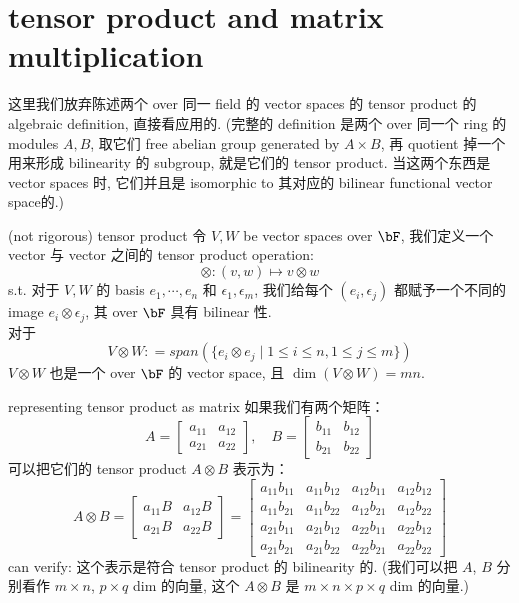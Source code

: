 \chapter{tensor product and matrix multiplication}
这里我们放弃陈述两个 over 同一 field 的 vector spaces 的 tensor product 的 algebraic definition, 直接看应用的. (完整的 definition 是两个 over 同一个 ring 的 modules $A,B$, 取它们 free abelian group generated by $A\times B$, 再 quotient 掉一个用来形成 bilinearity 的 subgroup, 就是它们的 tensor product. 当这两个东西是 vector spaces 时, 它们并且是 isomorphic to 其对应的 bilinear functional vector space的.)
\begin{definition}{(not rigorous) tensor product}
令 $V,W$ be vector spaces over $\bF$, 我们定义一个 vector 与 vector 之间的 tensor product operation:
$$
\otimes :(v,w) \mapsto v \otimes w
$$
s.t. 对于 $V, W$ 的 basis $e_1, \cdots, e_n$ 和 $\epsilon_1, \epsilon_m$, 我们给每个 $(e_i, \epsilon_j)$ 都赋予一个不同的 image $e_i \otimes \epsilon_j$,  其 over $\bF$ 具有 bilinear 性.\\
对于 
$$
V \otimes W : = span(\{ e_i \otimes e_j \mid 1 \leq i \leq n, 1\leq j\leq m    \})
$$
$V \otimes W $ 也是一个 over $\bF$ 的 vector space, 且 $\dim(V \otimes W) = mn$.
\end{definition}

\begin{proposition}{representing tensor product as matrix}
 如果我们有两个矩阵：
\[
A = \begin{bmatrix} a_{11} & a_{12} \\ a_{21} & a_{22} \end{bmatrix}, \quad
B = \begin{bmatrix} b_{11} & b_{12} \\ b_{21} & b_{22} \end{bmatrix}
\]
可以把它们的 tensor product \( A \otimes B \) 表示为：
\[
A \otimes B =
\begin{bmatrix} 
a_{11} B & a_{12} B \\ 
a_{21} B & a_{22} B 
\end{bmatrix}
=
\begin{bmatrix} 
a_{11} b_{11} & a_{11} b_{12} & a_{12} b_{11} & a_{12} b_{12} \\ 
a_{11} b_{21} & a_{11} b_{22} & a_{12} b_{21} & a_{12} b_{22} \\ 
a_{21} b_{11} & a_{21} b_{12} & a_{22} b_{11} & a_{22} b_{12} \\ 
a_{21} b_{21} & a_{21} b_{22} & a_{22} b_{21} & a_{22} b_{22} 
\end{bmatrix}
\]
can verify: 这个表示是符合 tensor product 的 bilinearity 的.
(我们可以把 $A$, $B$ 分别看作 $m\times n$, $p \times q$ dim 的向量, 这个 $A \otimes B$ 是 $m\times n \times p\times q$ dim 的向量.)
\end{proposition}

